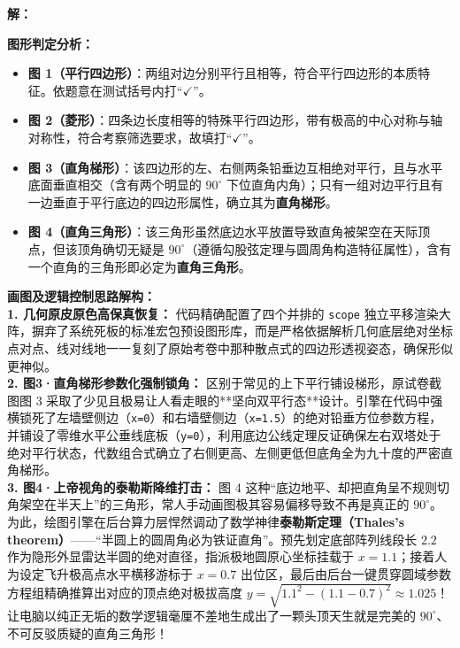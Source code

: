 \vspace{0.4cm}
\textbf{解：}

\textbf{图形判定分析：}
\begin{itemize}
    \item \textbf{图 1（平行四边形）}：两组对边分别平行且相等，符合平行四边形的本质特征。依题意在测试括号内打“$\checkmark$”。
    \item \textbf{图 2（菱形）}：四条边长度相等的特殊平行四边形，带有极高的中心对称与轴对称性，符合考察筛选要求，故填打“$\checkmark$”。
    \item \textbf{图 3（直角梯形）}：该四边形的左、右侧两条铅垂边互相绝对平行，且与水平底面垂直相交（含有两个明显的 $90^\circ$ 下位直角内角）；只有一组对边平行且有一边垂直于平行底边的四边形属性，确立其为\textbf{直角梯形}。
    \item \textbf{图 4（直角三角形）}：该三角形虽然底边水平放置导致直角被架空在天际顶点，但该顶角确切无疑是 $90^\circ$（遵循勾股弦定理与圆周角构造特征属性），含有一个直角的三角形即必定为\textbf{直角三角形}。
\end{itemize}

\vspace{0.4cm}
{\small\color{blue!70!black}
\textbf{画图及逻辑控制思路解构：}\\
\textbf{1. 几何原皮原色高保真恢复：} 代码精确配置了四个并排的 \texttt{scope} 独立平移渲染大阵，摒弃了系统死板的标准宏包预设图形库，而是严格依据解析几何底层绝对坐标点对点、线对线地一一复刻了原始考卷中那种散点式的四边形透视姿态，确保形似更神似。\\
\textbf{2. 图3·直角梯形参数化强制锁角：} 区别于常见的上下平行铺设梯形，原试卷截图图 3 采取了少见且极易让人看走眼的**坚向双平行态**设计。引擎在代码中强横锁死了左墙壁侧边（\texttt{x=0}）和右墙壁侧边（\texttt{x=1.5}）的绝对铅垂方位参数方程，并铺设了零维水平公垂线底板（\texttt{y=0}），利用底边公线定理反证确保左右双塔处于绝对平行状态，代数组合式确立了右侧更高、左侧更低但底角全为九十度的严密直角梯形。\\
\textbf{3. 图4·上帝视角的泰勒斯降维打击：} 图 4 这种“底边地平、却把直角呈不规则切角架空在半天上”的三角形，常人手动画图极其容易偏移导致不再是真正的 $90^\circ$。为此，绘图引擎在后台算力层悍然调动了数学神律\textbf{泰勒斯定理（Thales's theorem）}——“半圆上的圆周角必为铁证直角”。预先划定底部阵列线段长 $2.2$ 作为隐形外显雷达半圆的绝对直径，指派极地圆原心坐标挂载于 $x=1.1$；接着人为设定飞升极高点水平横移游标于 $x=0.7$ 出位区，最后由后台一键贯穿圆域参数方程组精确推算出对应的顶点绝对极拔高度 $y = \sqrt{1.1^2 - (1.1-0.7)^2} \approx 1.025$！让电脑以纯正无垢的数学逻辑毫厘不差地生成出了一颗头顶天生就是完美的 $90^\circ$、不可反驳质疑的直角三角形！
}

